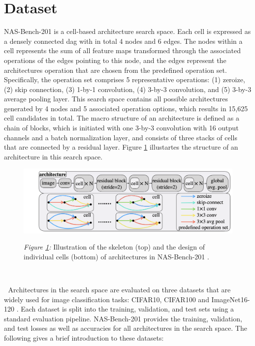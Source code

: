 \documentclass[a4paper,oneside,bibliography=totoc]{scrbook}
\begin{document}
\section{Dataset}
\label{sec: dataset}
NAS-Bench-201 is a cell-based architecture search space. Each cell is expressed as a densely connected \gls{dag} with in total 4 nodes and 6 edges. The nodes within a cell represents the sum of all feature maps transformed through the associated operations of the edges pointing to this node, and the edges represent the architectures operation that are chosen from the predefined operation set. Specifically, the operation set comprises 5 representative operations: (1) zeroize, (2) skip connection, (3) 1-by-1 convolution, (4) 3-by-3 convolution, and (5) 3-by-3 average pooling layer. This search space contains all possible architectures generated by 4 nodes and 5 associated operation options, which results in 15,625 cell candidates in total. The macro structure of an architecture is defined as a chain of blocks, which is initiated with one 3-by-3 convolution with 16 output channels and a batch normalization layer, and consists of three stacks of cells that are connected by a residual layer. Figure \ref{fig: nasbench201} illustartes the structure of an architecture in this search space.  
	\vspace{0.5em}	
	\begin{figure}[bthp]
		\centering
		\includegraphics[scale=0.48]{figs/nas_bench_201.png}
		\label{fig: nasbench201}
			\parbox{\linewidth}{
	 		\vspace{0.7em}
 	 		{\small \textit{Figure \ref{fig: nasbench201}:} Illustration of the skeleton (top) and the design of individual cells (bottom) of architectures in NAS-Bench-201 \cite{dong2020nasbench201}.
 	 		}
 		}
	\end{figure}
\newline

\newline
Architectures in the search space are evaluated on three datasets that are widely used for image classification tasks: CIFAR10, CIFAR100 \cite{krizhevsky2009learning} and ImageNet16-120 \cite{chrabaszcz2017downsampled}. Each dataset is split into the training, validation, and test sets using a standard evaluation pipeline. NAS-Bench-201 provides the training, validation, and test losses as well as accuracies for all architectures in the search space. The following gives a brief introduction to these datasets:
\end{document}
